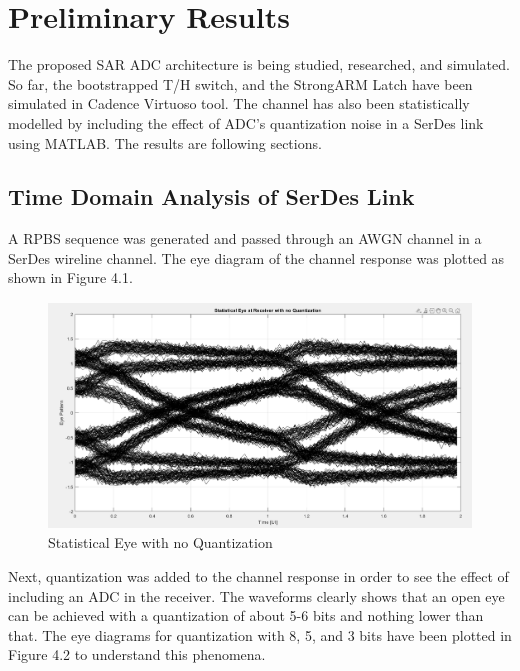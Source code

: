 
\chapter{Preliminary Results}
\graphicspath{{Preliminary Results/Vector/}{Preliminary Results/}}

The proposed SAR ADC architecture is being studied, researched, and simulated. So far, the bootstrapped T/H switch, and the StrongARM Latch have been simulated in Cadence Virtuoso tool. The channel has also been statistically modelled by including the effect of ADC's quantization noise in a SerDes link using MATLAB. The results are following sections.

\section{Time Domain Analysis of SerDes Link}

A RPBS sequence was generated and passed through an AWGN channel in a SerDes wireline channel. The eye diagram of the channel response was plotted as shown in Figure 4.1. \\

\begin{figure}[h]
	\centering
	\includegraphics[width=12cm,height=6cm]{fig4_1.png}
	\caption{Statistical Eye with no Quantization}
	\label{eye_wo_q}
\end{figure}

Next, quantization was added to the channel response in order to see the effect of including an ADC in the receiver. The waveforms clearly  shows that an open eye can be achieved with a quantization of about 5-6 bits and nothing lower than that. The eye diagrams for quantization with 8, 5, and 3 bits have been plotted in Figure 4.2 to understand this phenomena.

